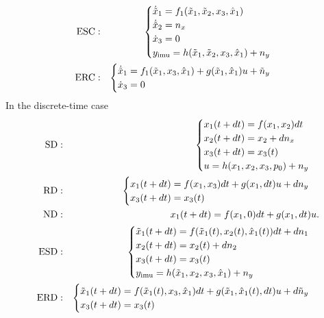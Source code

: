 \documentclass[]{article}
\def\imu{_\mathrm{imu}}
\begin{document}
{\begin{eqnarray}
{\rm ESC:} && \begin{cases} \dot{\tilde x}_1 = f_1(\tilde x_1, \tilde x_2, x_3, \hat x_1) \\
\dot{\tilde x}_2 = n_x \\
\dot x_3 = 0 \\
y\imu  = h(\tilde x_1, \tilde x_2, x_3, \hat x_1) + n_y \end{cases}
\nonumber\\
{\rm ERC:} && \begin{cases} \dot{\tilde x}_1 = f_1(\tilde x_1, x_3, \hat x_1) + g(\tilde x_1, \hat x_1) u + \tilde n_y \\
\dot x_3 = 0
 \end{cases}
\nonumber
\end{eqnarray}
In the discrete-time case
\begin{eqnarray}
{\rm SD:} && 
\begin{cases}
x_1(t+dt) = f(x_1,x_2)dt \\
x_2(t+dt) = x_2 + dn_x \\
x_3(t+dt)= x_3(t) \\
u = h(x_1, x_2, x_3, p_0) + n_y
\end{cases}\nonumber\\
{\rm RD:} && 
\begin{cases}
x_1(t+dt) = f(x_1, x_3)dt + g(x_1,dt)u + dn_y \\
x_3(t+dt) = x_3(t)
\end{cases}\nonumber\\
{\rm ND:} && %
x_1(t+dt) = f(x_1, 0)dt + g(x_1,dt) u.
\nonumber\\
{\rm ESD:} && \begin{cases} \tilde x_1(t+dt) = f(\tilde x_1(t), x_2(t), \hat x_1(t)) dt + dn_1 \\
x_2(t+dt) = x_2(t) + dn_2 \\
x_3(t+dt) = x_3(t) \\
 y\imu  = h(\tilde x_1, x_2, x_3, \hat x_1) + n_y \end{cases}\nonumber\\
{\rm ERD:} && \begin{cases} \tilde x_1(t+dt) = f(\tilde x_1(t), x_3,\hat x_1)dt + g(\tilde x_1, \hat x_1(t),dt)u + d \tilde n_y \\
x_3(t+dt) =  x_3(t)
\end{cases}\nonumber
\end{eqnarray}
}
\end{document}
